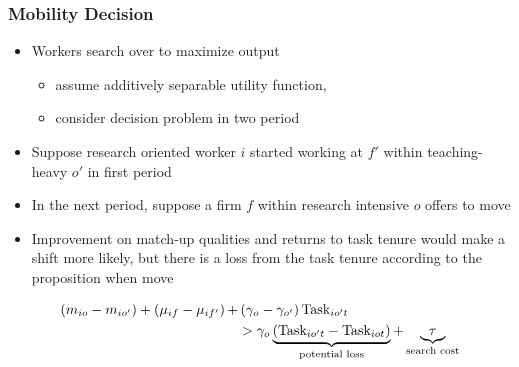\documentclass[11pt]{beamer}
\begin{document}
\begin{frame}
	\frametitle{Mobility Decision}
	\begin{itemize}
		\item Workers search over to maximize output%
		\begin{itemize}
			\item assume additively separable utility function, 
			\item consider decision problem in two period  
		\end{itemize}
		\item Suppose research oriented worker $i$ started working at $f'$ within teaching-heavy $o'$ in first period
		\item In the next period, suppose a firm $f$ within research intensive $o$ offers to move
		\item Improvement on match-up qualities and returns to task tenure would make a shift more likely, but there is a loss from the task tenure according to the proposition when move
	\end{itemize}
	\begin{align}
		\left(m_{io}-m_{io'} \right) + \left( \mu_{if}-\mu_{if'}\right) +&\left( \gamma_o-\gamma_{o'}\right) \text{Task}_{io't} \\
		&> \gamma_o \underbrace{\left(\text{Task}_{io't} - \text{Task}_{iot} \right)}_{\text{potential loss}} + \underbrace{\tau}_{\text{search cost}} \notag
	\end{align}
	
	
\end{frame}
\end{document}
